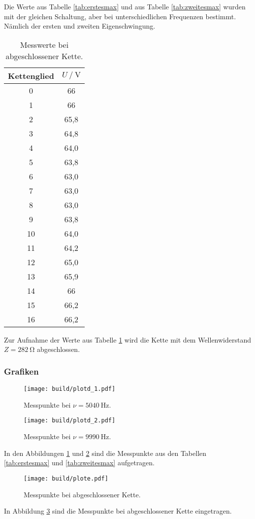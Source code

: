 Die Werte aus Tabelle \ref{tab:erstesmax} und aus Tabelle \ref{tab:zweitesmax}
wurden mit der gleichen Schaltung, aber bei unterschiedlichen Frequenzen bestimmt.
Nämlich der ersten und zweiten Eigenschwingung.


\begin{table}[h]
  \centering
  \caption{Messwerte bei abgeschlossener Kette.}
  \label{tab:absw=wellw}
  \begin{tabular}{c c}
    \toprule
     Kettenglied & $U \:/\: \si{\volt}$\\
    \midrule
    0 & 66\\
    1 & 66\\
    2 & 65,8\\
    3 & 64,8\\
    4 & 64,0\\
    5 & 63,8\\
    6 & 63,0\\
    7 & 63,0\\
    8 & 63,0\\
    9 & 63,8\\
    10 & 64,0\\
    11 & 64,2\\
    12 & 65,0\\
    13 & 65,9\\
    14 & 66\\
    15 & 66,2\\
    16 & 66,2\\
    \bottomrule
  \end{tabular}
\end{table}

Zur Aufnahme der Werte aus Tabelle \ref{tab:absw=wellw} wird die Kette mit dem
Wellenwiderstand $Z = \SI{282}{\ohm}$ abgeschlossen.

\subsubsection{Grafiken}

\begin{figure}[h]
  \centering
  \texttt{[image: build/plotd\_1.pdf]}
  \caption{Messpunkte bei $\nu = \SI{5040}{\hertz}$.}
  \label{fig:erstesmax}
\end{figure}

\begin{figure}[h]
  \centering
  \texttt{[image: build/plotd\_2.pdf]}
  \caption{Messpunkte bei $\nu = \SI{9990}{\hertz}$.}
  \label{fig:zweitesmax}
\end{figure}

In den Abbildungen \ref{fig:erstesmax} und \ref{fig:zweitesmax} sind die Messpunkte
aus den Tabellen \ref{tab:erstesmax} und \ref{tab:zweitesmax} aufgetragen.

\begin{figure}[h]
  \centering
  \texttt{[image: build/plote.pdf]}
  \caption{Messpunkte bei abgeschlossener Kette.}
  \label{fig:absw=wellw}
\end{figure}

In Abbildung \ref{fig:absw=wellw} sind die Messpunkte bei abgeschlossener Kette
eingetragen.
